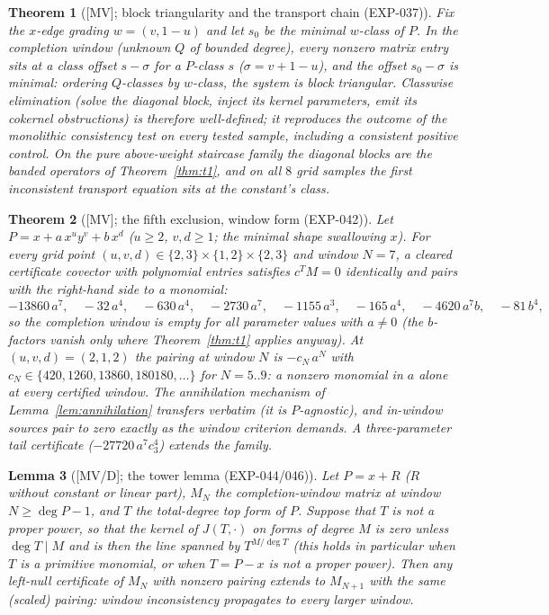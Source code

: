 \documentclass[11pt]{article}
\newtheorem{theorem}{Theorem}[section]
\newtheorem{lemma}[theorem]{Lemma}
\theoremstyle{remark}
\begin{document}
\begin{theorem}[{[MV]}; block triangularity and the transport chain (EXP-037)]
\label{thm:transport}
Fix the $x$-edge grading $w = (v, 1-u)$ and let $s_0$ be the minimal $w$-class of $P$. In
the completion window (unknown $Q$ of bounded degree), every nonzero matrix entry sits at a
class offset $s - \sigma$ for a $P$-class $s$ ($\sigma = v + 1 - u$), and the offset
$s_0 - \sigma$ is minimal: ordering $Q$-classes by $w$-class, the system is block
triangular. Classwise elimination (solve the diagonal block, inject its kernel parameters,
emit its cokernel obstructions) is therefore well-defined; it reproduces the outcome of the
monolithic consistency test on every tested sample, including a consistent positive control. On the
pure above-weight staircase family the diagonal blocks are the banded operators of
Theorem~\ref{thm:t1}, and on all $8$ grid samples the first inconsistent transport equation
sits at the \emph{constant's} class.
\end{theorem}

\begin{theorem}[{[MV]}; the fifth exclusion, window form (EXP-042)]\label{thm:t5}
Let $P = x + a\,x^u y^v + b\,x^d$ ($u \ge 2$, $v, d \ge 1$; the minimal shape swallowing
$x$). For every grid point $(u, v, d) \in \{2,3\} \times \{1,2\} \times \{2,3\}$ and window
$N = 7$, a cleared certificate covector with polynomial entries satisfies $c^T M = 0$
identically and pairs with the right-hand side to a \emph{monomial}:
\[
-13860\,a^7,\quad -32\,a^4,\quad -630\,a^4,\quad -2730\,a^7,\quad -1155\,a^3,\quad
-165\,a^4,\quad -4620\,a^7 b,\quad -81\,b^4,
\]
so the completion window is empty for \emph{all} parameter values with $a \ne 0$ (the
$b$-factors vanish only where Theorem~\ref{thm:t1} applies anyway). At $(u, v, d) =
(2, 1, 2)$ the pairing at window $N$ is $-c_N\,a^N$ with $c_N \in \{420, 1260, 13860,
180180, \dots\}$ for $N = 5..9$: a nonzero monomial in $a$ alone at every certified window.
The annihilation mechanism of Lemma~\ref{lem:annihilation} transfers verbatim (it is
$P$-agnostic), and in-window sources pair to zero exactly as the window criterion demands.
A three-parameter tail certificate ($-27720\,a^7 c_3^4$) extends the family.
\end{theorem}
\begin{lemma}[{[MV/D]}; the tower lemma (EXP-044/046)]\label{lem:tower}
Let $P = x + R$ ($R$ without constant or linear part), $M_N$ the completion-window
matrix at window $N \ge \deg P - 1$, and $T$ the total-degree top form of $P$. Suppose that
$T$ is not a proper power, so that the kernel of $J(T,\cdot)$ on forms of degree $M$ is zero unless
$\deg T \mid M$ and is then the line spanned by $T^{M/\deg T}$ (this holds in particular when $T$ is a primitive
monomial, or when $T=P-x$ is not a proper power). Then any left-null certificate of $M_N$ with
nonzero pairing extends to $M_{N+1}$ with the same (scaled) pairing: window
inconsistency propagates to every larger window.
\end{lemma}
\end{document}
